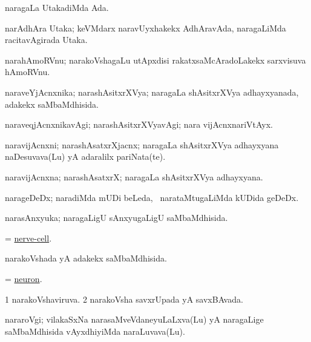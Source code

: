 \bentry
{}
\gl{\gu}
\bmng
naragaLa UtakadiMda Ada. 
\emng
\eentry

\bentry
{}
\gl{\nA}
\bmng
narAdhAra Utaka; keVMdarx naravUyxhakekx AdhAravAda, naragaLiMda racitavAgirada Utaka. 
\emng
\eentry

\bentry
{}
\gl{\nA}
\bmng
narahAmoRVnu; narakoVshagaLu utApxdisi rakatxsaMcAradoLakekx sarxvisuva hAmoRVnu. 
\emng
\eentry

\bentry
{}
\gl{\gu}
\bmng
naraveYjAcnxnika; narashAsitxrXVya; naragaLa shAsitxrXVya adhayxyanada, adakekx saMbaMdhisida. 
\emng
\eentry

\bentry
{}
\gl{\kirxvi}
\bmng
naraveqjAcnxnikavAgi; narashAsitxrXVyavAgi; nara vijAcnxnariVtAyx. 
\emng
\eentry

\bentry
{}
\gl{\nA}
\bmng
naravijAcnxni; narashAsatxrXjacnx; naragaLa shAsitxrXVya adhayxyana naDesuvava(Lu) yA adaralilx pariNata(te). 
\emng
\eentry

\bentry
{}
\gl{\nA}
\bmng
naravijAcnxna; narashAsatxrX; naragaLa shAsitxrXVya adhayxyana. 
\emng
\eentry

\bentry
{}
\gl{\nA}
\bmng
narageDeDx; naradiMda mUDi beLeda, \sA\ narataMtugaLiMda kUDida geDeDx. 
\emng
\eentry

\bentry
{}
\gl{\gu}
\bmng
narasAnxyuka; naragaLigU sAnxyugaLigU saMbaMdhisida. 
\emng
\eentry

\bentry
{}
\gl{\nA}
\bmng
= \hyperlink{nerve-cell}{nerve-cell}. 
\emng
\eentry

\bentry
{}
\gl{\gu}
\bmng
narakoVshada yA adakekx saMbaMdhisida. 
\emng
\eentry

\bentry
{}
\gl{\nA}
\bmng
= \hyperlink{neuron}{neuron}. 
\emng
\eentry

\bentry
{}
\gl{\gu}
\bmng
\bnum
\num{1} narakoVshaviruva. 
\num{2} narakoVsha savxrUpada yA savxBAvada. 
\enum
\emng
\eentry

\bentry
{}
\gl{\nA}
\bmng
nararoVgi; vilakaSxNa narasaMveVdaneyuLaLxva(Lu) yA naragaLige saMbaMdhisida vAyxdhiyiMda naraLuvava(Lu). 
\emng
\eentry

